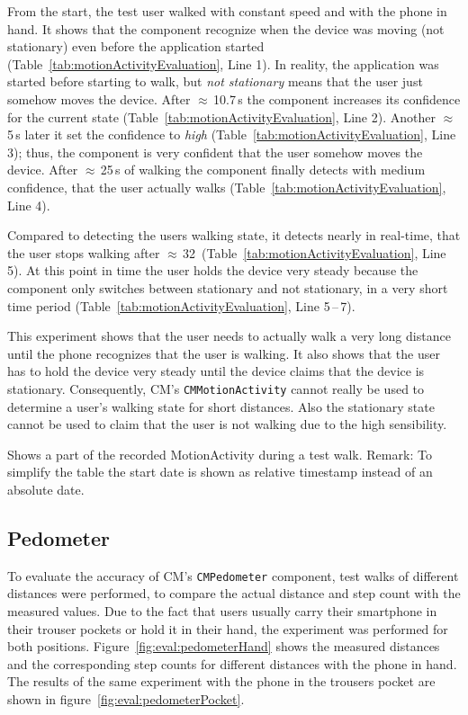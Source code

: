 From the start, the test user walked with constant speed and with the phone in hand. It shows that the component recognize when the device was moving (not stationary) even before the application started (Table~\ref{tab:motionActivityEvaluation}, Line 1). In reality, the application was started before starting to walk, but \emph{not stationary} means that the user just somehow moves the device. After $\approx$\,10.7\,s the component increases its confidence for the current state (Table~\ref{tab:motionActivityEvaluation}, Line 2). Another $\approx$5\,s later it set the confidence to \emph{high} (Table~\ref{tab:motionActivityEvaluation}, Line 3); thus, the component is very confident that the user somehow moves the device. After $\approx$\,25\,s of walking the component finally detects with medium confidence, that the user actually walks (Table~\ref{tab:motionActivityEvaluation}, Line 4).

Compared to detecting the users walking state, it detects nearly in real-time, that the user stops walking after $\approx$\,32\, (Table~\ref{tab:motionActivityEvaluation}, Line 5). At this point in time the user holds the device very steady because the component only switches between stationary and not stationary, in a very short time period (Table~\ref{tab:motionActivityEvaluation}, Line 5\,--\,7).

This experiment shows that the user needs to actually walk a very long distance until the phone recognizes that the user is walking. It also shows that the user has to hold the device very steady until the device claims that the device is stationary. Consequently, \ac{CM}'s \texttt{CMMotionActivity} cannot really be used to determine a user's walking state for short distances. Also the stationary state cannot be used to claim that the user is not walking due to the high sensibility.

\begin{table}
	
	\caption{Shows a part of the recorded MotionActivity during a test walk. Remark: To simplify the table the start date is shown as relative timestamp instead of an absolute date.}
	\label{tab:motionActivityEvaluation}
\end{table}


\subsection{Pedometer}
To evaluate the accuracy of \ac{CM}'s \texttt{CMPedometer} component, test walks of different distances  were performed, to compare the actual distance and step count with the measured values. Due to the fact that users usually carry their smartphone in their trouser pockets or hold it in their hand, the experiment was performed for both positions. Figure~\ref{fig:eval:pedometerHand} shows the measured distances and the corresponding step counts for different distances with the phone in hand. The results of the same experiment with the phone in the trousers pocket are shown in figure~\ref{fig:eval:pedometerPocket}.

